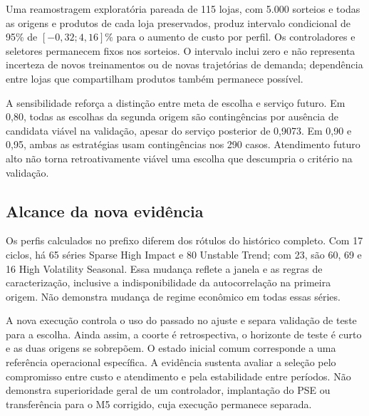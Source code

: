 Uma reamostragem exploratória pareada de 115 lojas, com 5.000 sorteios e todas as origens e produtos de cada loja preservados, produz intervalo condicional de 95\% de $[-0{,}32;4{,}16]\%$ para o aumento de custo por perfil. Os controladores e seletores permanecem fixos nos sorteios. O intervalo inclui zero e não representa incerteza de novos treinamentos ou de novas trajetórias de demanda; dependência entre lojas que compartilham produtos também permanece possível.

A sensibilidade reforça a distinção entre meta de escolha e serviço futuro. Em 0,80, todas as escolhas da segunda origem são contingências por ausência de candidata viável na validação, apesar do serviço posterior de 0,9073. Em 0,90 e 0,95, ambas as estratégias usam contingências nos 290 casos. Atendimento futuro alto não torna retroativamente viável uma escolha que descumpria o critério na validação.

\subsection{Alcance da nova evidência}

Os perfis calculados no prefixo diferem dos rótulos do histórico completo. Com 17 ciclos, há 65 séries Sparse High Impact e 80 Unstable Trend; com 23, são 60, 69 e 16 High Volatility Seasonal. Essa mudança reflete a janela e as regras de caracterização, inclusive a indisponibilidade da autocorrelação na primeira origem. Não demonstra mudança de regime econômico em todas essas séries.

A nova execução controla o uso do passado no ajuste e separa validação de teste para a escolha. Ainda assim, a coorte é retrospectiva, o horizonte de teste é curto e as duas origens se sobrepõem. O estado inicial comum corresponde a uma referência operacional específica. A evidência sustenta avaliar a seleção pelo compromisso entre custo e atendimento e pela estabilidade entre períodos. Não demonstra superioridade geral de um controlador, implantação do PSE ou transferência para o M5 corrigido, cuja execução permanece separada.
